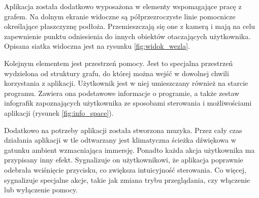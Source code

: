 
Aplikacja została dodatkowo wyposażona w elementy wspomagające pracę z grafem. Na dolnym ekranie widoczne są półprzezroczyste linie pomocnicze określające płaszczyznę podłoża. Przemieszczają się one z kamerą i mają na celu zapewnienie punktu odniesienia do innych obiektów otaczających użytkownika. Opisana siatka widoczna jest na rysunku \ref{fig:widok_wezla}.

Kolejnym elementem jest przestrzeń pomocy. Jest to specjalna przestrzeń wydzielona od struktury grafu, do której można wejść w dowolnej chwili korzystania z aplikacji. Użytkownik jest w niej umieszczany również na starcie programu. Zawiera ona podstawowe informacje o programie, a także zestaw infografik zapoznających użytkownika ze sposobami sterowania i możliwościami aplikacji (rysunek \ref{fig:info_space}).


Dodatkowo na potrzeby aplikacji została stworzona muzyka. Przez cały czas działania aplikacji w tle odtwarzany jest klimatyczna ścieżka dźwiękowa w gatunku ambient wzmacniająca immersję. Ponadto każda akcja użytkownika ma przypisany inny efekt. Sygnalizuje on użytkownikowi, że aplikacja poprawnie odebrała wciśnięcie przycisku, co zwiększa intuicyjność sterowania. Co więcej, sygnalizuje specjalne akcje, takie jak zmiana trybu przeglądania, czy włączenie lub wyłączenie pomocy.